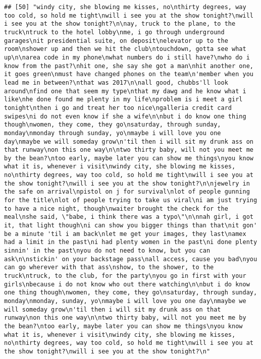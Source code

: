 \documentclass[]{article}
\begin{document}
\begin{verbatim}
## [50] "windy city, she blowing me kisses, no\nthirty degrees, way too cold, so hold me tight\nwill i see you at the show tonight?\nwill i see you at the show tonight?\n\nay, truck to the plane, to the truck\ntruck to the hotel lobby\nme, i go through underground garages\nit presidential suite, on deposit\nelevator up to the room\nshower up and then we hit the club\ntouchdown, gotta see what up\n\narea code in my phone\nwhat numbers do i still have?\nwho do i know from the past?\nhit one, she say she got a man\nhit another one, it goes green\nmust have changed phones on the team\n'member when you lead me in between?\nthat was 2017\n\nall good, chubbs'll look around\nfind one that seem my type\nthat my dawg and he know what i like\nhe done found me plenty in my life\nproblem is i meet a girl tonight\nthen i go and treat her too nice\ngalleria credit card swipes\ni do not even know if she a wife\n\nbut i do know one thing though\nwomen, they come, they go\nsaturday, through sunday, monday\nmonday through sunday, yo\nmaybe i will love you one day\nmaybe we will someday grow\n'til then i will sit my drunk ass on that runway\non this one way\n\ntwo thirty baby, will not you meet me by the bean?\ntoo early, maybe later you can show me things\nyou know what it is, whenever i visit\nwindy city, she blowing me kisses, no\nthirty degrees, way too cold, so hold me tight\nwill i see you at the show tonight?\nwill i see you at the show tonight?\n\njewelry in the safe on arrival\npistol on j for survival\nlot of people gunning for the title\nlot of people trying to take us viral\ni am just trying to have a nice night, though\nwaiter brought the check for the meal\nshe said, \"babe, i think there was a typo\"\n\nnah girl, i got it, that light though\ni can show you bigger things than that\nit gon' be a minute 'til i am back\nlet me get your images, they last\namex had a limit in the past\ni had plenty women in the past\ni done plenty sinnin' in the past\nyou do not need to know, but you can ask\n\nstickin' on your backstage pass\nall access, cause you bad\nyou can go wherever with that ass\nshow, to the shower, to the truck\ntruck, to the club, for the party\nyou go in first with your girls\nbecause i do not know who out there watching\n\nbut i do know one thing though\nwomen, they come, they go\nsaturday, through sunday, monday\nmonday, sunday, yo\nmaybe i will love you one day\nmaybe we will someday grow\n'til then i will sit my drunk ass on that runway\non this one way\n\ntwo thirty baby, will not you meet me by the bean?\ntoo early, maybe later you can show me things\nyou know what it is, whenever i visit\nwindy city, she blowing me kisses, no\nthirty degrees, way too cold, so hold me tight\nwill i see you at the show tonight?\nwill i see you at the show tonight?\n"
\end{verbatim}
\end{document}
